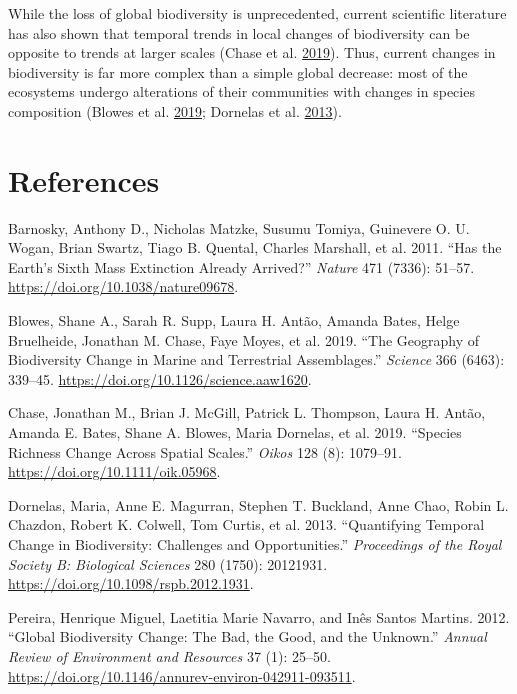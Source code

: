 \documentclass[
  12pt,
  oneside]{report}
\begin{document}
While the loss of global biodiversity is unprecedented, current scientific literature has also shown that temporal trends in local changes of biodiversity can be opposite to trends at larger scales (Chase et al. \protect\hyperlink{ref-chase_species_2019}{2019}). Thus, current changes in biodiversity is far more complex than a simple global decrease: most of the ecosystems undergo alterations of their communities with changes in species composition (Blowes et al. \protect\hyperlink{ref-blowes_geography_2019}{2019}; Dornelas et al. \protect\hyperlink{ref-dornelas_quantifying_2013}{2013}).

\hypertarget{references}{%
\chapter*{References}\label{references}}

\singlespacing

\hypertarget{refs}{}
\leavevmode\hypertarget{ref-barnosky_has_2011}{}%
Barnosky, Anthony D., Nicholas Matzke, Susumu Tomiya, Guinevere O. U. Wogan, Brian Swartz, Tiago B. Quental, Charles Marshall, et al. 2011. ``Has the Earth's Sixth Mass Extinction Already Arrived?'' \emph{Nature} 471 (7336): 51--57. \url{https://doi.org/10.1038/nature09678}.

\leavevmode\hypertarget{ref-blowes_geography_2019}{}%
Blowes, Shane A., Sarah R. Supp, Laura H. Antão, Amanda Bates, Helge Bruelheide, Jonathan M. Chase, Faye Moyes, et al. 2019. ``The Geography of Biodiversity Change in Marine and Terrestrial Assemblages.'' \emph{Science} 366 (6463): 339--45. \url{https://doi.org/10.1126/science.aaw1620}.

\leavevmode\hypertarget{ref-chase_species_2019}{}%
Chase, Jonathan M., Brian J. McGill, Patrick L. Thompson, Laura H. Antão, Amanda E. Bates, Shane A. Blowes, Maria Dornelas, et al. 2019. ``Species Richness Change Across Spatial Scales.'' \emph{Oikos} 128 (8): 1079--91. \url{https://doi.org/10.1111/oik.05968}.

\leavevmode\hypertarget{ref-dornelas_quantifying_2013}{}%
Dornelas, Maria, Anne E. Magurran, Stephen T. Buckland, Anne Chao, Robin L. Chazdon, Robert K. Colwell, Tom Curtis, et al. 2013. ``Quantifying Temporal Change in Biodiversity: Challenges and Opportunities.'' \emph{Proceedings of the Royal Society B: Biological Sciences} 280 (1750): 20121931. \url{https://doi.org/10.1098/rspb.2012.1931}.

\leavevmode\hypertarget{ref-pereira_global_2012}{}%
Pereira, Henrique Miguel, Laetitia Marie Navarro, and Inês Santos Martins. 2012. ``Global Biodiversity Change: The Bad, the Good, and the Unknown.'' \emph{Annual Review of Environment and Resources} 37 (1): 25--50. \url{https://doi.org/10.1146/annurev-environ-042911-093511}.
\end{document}
